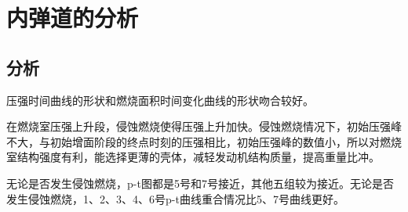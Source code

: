 
\chapter{内弹道的分析}

\section{分析}

压强时间曲线的形状和燃烧面积时间变化曲线的形状吻合较好。

在燃烧室压强上升段，侵蚀燃烧使得压强上升加快。侵蚀燃烧情况下，初始压强峰不大，与初始增面阶段的终点时刻的压强相比，初始压强峰的数值小，所以对燃烧室结构强度有利，能选择更薄的壳体，减轻发动机结构质量，提高重量比冲。

无论是否发生侵蚀燃烧，p-t图都是5号和7号接近，其他五组较为接近。无论是否发生侵蚀燃烧，1、2、3、4、6号p-t曲线重合情况比5、7号曲线更好。
